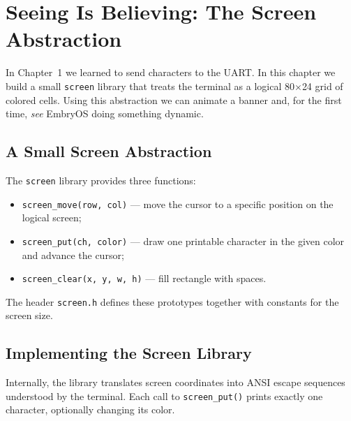 \chapter{Seeing Is Believing: The Screen Abstraction}

In Chapter~1 we learned to send characters to the UART.  In this chapter we
build a small \texttt{screen} library that treats the terminal as a logical
80$\times$24 grid of colored cells.  Using this abstraction we can animate a
banner and, for the first time, \emph{see} EmbryOS doing something dynamic.

\section{A Small Screen Abstraction}

The \texttt{screen} library provides three functions:
\begin{itemize}
  \item \texttt{screen\_move(row, col)} --- move the cursor to a specific
        position on the logical screen;
  \item \texttt{screen\_put(ch, color)} --- draw one printable character in the
        given color and advance the cursor;
  \item \texttt{screen\_clear(x, y, w, h)} --- fill rectangle with spaces.
\end{itemize}
The header \texttt{screen.h} defines these prototypes together with constants
for the screen size.

\begin{figure}[H]
\centering
\begin{minipage}{0.7\textwidth}

\end{minipage}
\end{figure}

\section{Implementing the Screen Library}

Internally, the library translates screen coordinates into ANSI escape sequences
understood by the terminal.  Each call to \texttt{screen\_put()} prints exactly
one character, optionally changing its color.

\begin{figure}[H]
\centering
\begin{minipage}{0.9\textwidth}

\end{minipage}
\end{figure}

